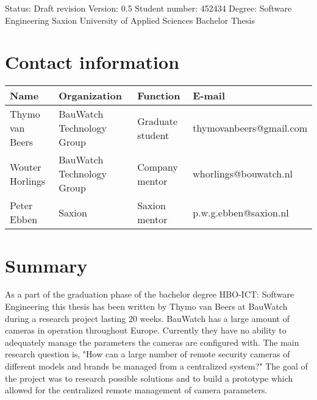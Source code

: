 \begin{titlepage} 
\maketitle
\vspace*{\fill}
Status: Draft revision
Version: 0.5
Student number: 452434
Degree: Software Engineering
Saxion University of Applied Sciences
Bachelor Thesis
\thispagestyle{empty}
\end{titlepage}

\chapter*{Contact information}
\begin{center}
\begin{tabular}{ | m{8em} | m{8em} | m{8em} | m{11.1em} | }
\hline
\textbf{Name} & \textbf{Organization} & \textbf{Function} & \textbf{E-mail}
\\ \hline
Thymo van Beers & BauWatch Technology Group & Graduate student & thymovanbeers@gmail.com
\\ \hline
Wouter Horlings & BauWatch Technology Group & Company mentor & whorlings@bouwatch.nl
\\ \hline
Peter Ebben & Saxion & Saxion mentor & p.w.g.ebben@saxion.nl
\\ \hline
\end{tabular}
\end{center}
\thispagestyle{empty}
\chapter*{Summary}
As a part of the graduation phase of the bachelor degree HBO-ICT: Software Engineering this thesis has been written by Thymo van Beers at BauWatch during a research project lasting 20 weeks.
BauWatch has a large amount of cameras in operation throughout Europe.
Currently they have no ability to adequately manage the parameters the cameras are configured with.
The main research question is, "How can a large number of remote security cameras of different models and brands be managed from a centralized system?"
The goal of the project was to research possible solutions and to build a prototype which allowed for the centralized remote management of camera parameters.

